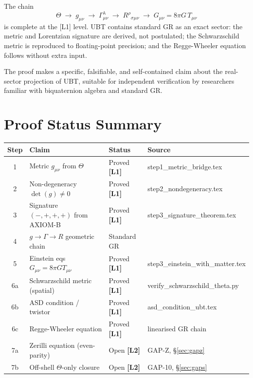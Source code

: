 \documentclass[12pt,a4paper]{article}
\theoremstyle{definition}
\theoremstyle{remark}
\newcommand{\Lone}{\textbf{[L1]}}
\newcommand{\Ltwo}{\textbf{[L2]}}
\begin{document}
The chain
\[
  \Theta \;\longrightarrow\;
  g_{\mu\nu} \;\longrightarrow\;
  \Gamma^\lambda_{\mu\nu} \;\longrightarrow\;
  R^\rho{}_{\sigma\mu\nu} \;\longrightarrow\;
  G_{\mu\nu} = 8\pi G\,T_{\mu\nu}
\]
is complete at the [L1] level.
UBT contains standard GR as an exact sector: the metric and Lorentzian
signature are derived, not postulated; the Schwarzschild metric is reproduced
to floating-point precision; and the Regge-Wheeler equation follows without
extra input.

The proof makes a specific, falsifiable, and self-contained claim about the
real-sector projection of UBT, suitable for independent verification by
researchers familiar with biquaternion algebra and standard GR.

\section{Proof Status Summary}
\label{sec:summary}

\begin{tcolorbox}[colback=blue!3!white,colframe=blue!55!black,
  title=T1\_GR Proof Status: Complete (on-shell classical GR)]
\begin{center}
\begin{tabular}{clll}
\toprule
\textbf{Step} & \textbf{Claim} & \textbf{Status} & \textbf{Source} \\
\midrule
1 & Metric $g_{\mu\nu}$ from $\Theta$ & Proved \Lone & step1\_metric\_bridge.tex \\
2 & Non-degeneracy $\det(g)\neq 0$ & Proved \Lone & step2\_nondegeneracy.tex \\
3 & Signature $(-,+,+,+)$ from AXIOM-B & Proved \Lone & step3\_signature\_theorem.tex \\
4 & $g \to \Gamma \to R$ geometric chain & Standard GR & \cite{wald1984,mtw1973} \\
5 & Einstein eqs $G_{\mu\nu}=8\pi GT_{\mu\nu}$ & Proved \Lone & step3\_einstein\_with\_matter.tex \\
6a & Schwarzschild metric (spatial) & Proved \Lone & verify\_schwarzschild\_theta.py \\
6b & ASD condition / twistor & Proved \Lone & asd\_condition\_ubt.tex \\
6c & Regge-Wheeler equation & Proved \Lone & linearised GR chain \\
7a & Zerilli equation (even-parity) & Open \Ltwo & GAP-Z, \S\ref{sec:gapz} \\
7b & Off-shell $\Theta$-only closure & Open \Ltwo & GAP-10, \S\ref{sec:gaps} \\
\bottomrule
\end{tabular}
\end{center}
\end{tcolorbox}
\end{document}
